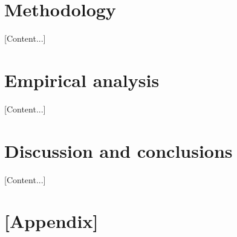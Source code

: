 \documentclass[12pt,a4paper,oneside,openright]{report}
\begin{document}
\chapter{Methodology}
[Content...]

\chapter{Empirical analysis}
[Content...]

\chapter{Discussion and conclusions}
[Content...]

\printbibliography[heading=bibintoc, title={References}]

\appendix
\chapter{[Appendix]}
\end{document}
